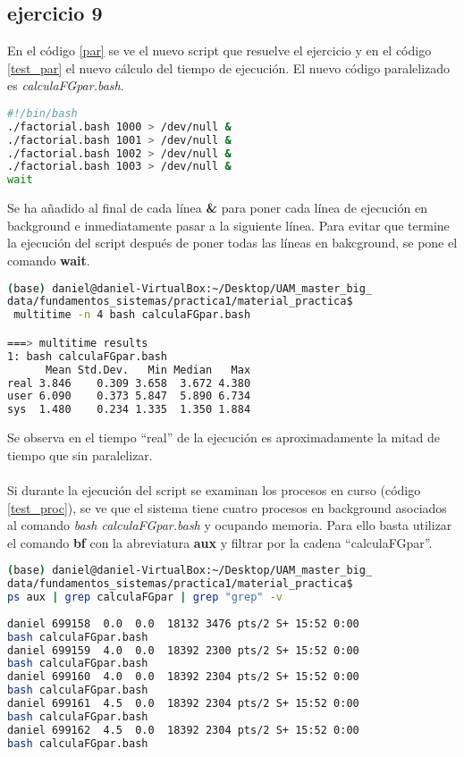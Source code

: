 \subsection*{ejercicio 9}
%
En el código \ref{par} se ve el nuevo script que resuelve el ejercicio y en el código \ref{test_par} el nuevo cálculo del tiempo de ejecución. El nuevo código paralelizado es \textit{calculaFGpar.bash}.
\begin{lstlisting}[language=bash,caption={Modificación del script \textit{calculaFG.bash}}, label={par}]
#!/bin/bash
./factorial.bash 1000 > /dev/null &
./factorial.bash 1001 > /dev/null &
./factorial.bash 1002 > /dev/null &
./factorial.bash 1003 > /dev/null &
wait    
\end{lstlisting}
Se ha añadido al final de cada línea \textbf{\&} para poner cada línea de ejecución en background e inmediatamente pasar a la siguiente línea. Para evitar que termine la ejecución del script después de poner todas las líneas en bakcground, se pone el comando \textbf{wait}.
\begin{lstlisting}[language=bash,caption={Tiempo de ejecución del script \textit{calculaFGpar.bash}}, label={test_par}]
(base) daniel@daniel-VirtualBox:~/Desktop/UAM_master_big_
data/fundamentos_sistemas/practica1/material_practica$
 multitime -n 4 bash calculaFGpar.bash

===> multitime results
1: bash calculaFGpar.bash
      Mean Std.Dev.   Min Median   Max
real 3.846    0.309 3.658  3.672 4.380       
user 6.090    0.373 5.847  5.890 6.734       
sys  1.480    0.234 1.335  1.350 1.884   
\end{lstlisting}
Se observa en el tiempo ``real'' de la ejecución es aproximadamente la mitad de tiempo que sin paralelizar.\\\\
Si durante la ejecución del script se examinan los procesos en curso (código \ref{test_proc}), se ve que el sistema tiene cuatro procesos en background asociados al comando \textit{bash calculaFGpar.bash} y ocupando memoria. Para ello basta utilizar el comando \textbf{bf} con la abreviatura \textbf{aux} y filtrar por la cadena ``calculaFGpar''.
\begin{lstlisting}[language=bash,caption={Procesos en curso durante la ejecución paralela de \textit{calculaFGpar.bash}}, label={test_proc}]
(base) daniel@daniel-VirtualBox:~/Desktop/UAM_master_big_
data/fundamentos_sistemas/practica1/material_practica$
ps aux | grep calculaFGpar | grep "grep" -v
 
daniel 699158  0.0  0.0  18132 3476 pts/2 S+ 15:52 0:00 
bash calculaFGpar.bash 
daniel 699159  4.0  0.0  18392 2300 pts/2 S+ 15:52 0:00 
bash calculaFGpar.bash
daniel 699160  4.0  0.0  18392 2304 pts/2 S+ 15:52 0:00 
bash calculaFGpar.bash
daniel 699161  4.5  0.0  18392 2304 pts/2 S+ 15:52 0:00 
bash calculaFGpar.bash
daniel 699162  4.5  0.0  18392 2304 pts/2 S+ 15:52 0:00 
bash calculaFGpar.bash 
\end{lstlisting}
